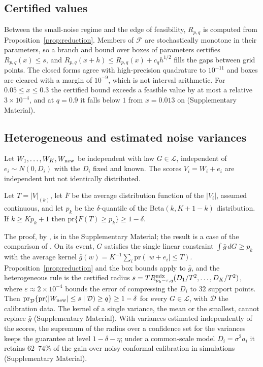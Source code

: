 \documentclass[lineno]{biometrika}
\newcommand{\pr}{\mathrm{pr}}
\newcommand{\LC}{\mathcal{L}}
\begin{document}
\subsection{Certified values}

Between the small-noise regime and the edge of feasibility, $R_{p,q}$ is computed from Proposition~\ref{prop:reduction}. Members of $\mathcal F$ are stochastically monotone in their parameters, so a branch and bound over boxes of parameters certifies $R_{p,q}(x) \le s$, and $R_{p,q}(x + h) \le R_{p,q}(x) + c_q h^{1/2}$ fills the gaps between grid points. The closed forms agree with high-precision quadrature to $10^{-11}$ and boxes are cleared with a margin of $10^{-9}$, which is not interval arithmetic. For $0.05 \le x \le 0.3$ the certified bound exceeds a feasible value by at most a relative $3\times10^{-4}$, and at $q = 0.9$ it falls below $1$ from $x = 0.013$ on (Supplementary Material).

\subsection{Heterogeneous and estimated noise variances}\label{sec:hetero}

Let $W_1, \ldots, W_K, W_{\rm new}$ be independent with law $G \in \LC$, independent of $e_i \sim N(0, D_i)$ with the $D_i$ fixed and known. The scores $V_i = W_i + e_i$ are independent but not identically distributed.

\begin{proposition}\label{prop:beta}
Let $T = |V|_{(k)}$, let $\bar F$ be the average distribution function of the $|V_i|$, assumed continuous, and let $p_k$ be the $\delta$-quantile of the Beta$(k, K+1-k)$ distribution. If $k \ge Kp_k + 1$ then $\pr\{\bar F(T) \ge p_k\} \ge 1 - \delta$.
\end{proposition}


The proof, by \citet{hoeffding1956}, is in the Supplementary Material; the result is a case of the comparison of \citet{sen1970}. On its event, $G$ satisfies the single linear constraint $\int \bar g\, dG \ge p_k$ with the average kernel $\bar g(w) = K^{-1}\sum_i \pr(|w + e_i| \le T)$. Proposition~\ref{prop:reduction} and the box bounds apply to $\bar g$, and the heterogeneous rule is the certified radius $s = T R^{\rm mix}_{p_k - \varepsilon, q}(D_1/T^2, \ldots, D_K/T^2)$, where $\varepsilon \approx 2\times10^{-4}$ bounds the error of compressing the $D_i$ to $32$ support points. Then $\pr_{\mathcal D}\{\pr(|W_{\rm new}| \le s \mid \mathcal D) \ge q\} \ge 1 - \delta$ for every $G \in \LC$, with $\mathcal D$ the calibration data. The kernel of a single variance, the mean or the smallest, cannot replace $\bar g$ (Supplementary Material). With variances estimated independently of the scores, the supremum of the radius over a confidence set for the variances keeps the guarantee at level $1 - \delta - \eta$; under a common-scale model $D_i = \sigma^2 a_i$ it retains $62$--$74\%$ of the gain over noisy conformal calibration in simulations (Supplementary Material).
\end{document}

